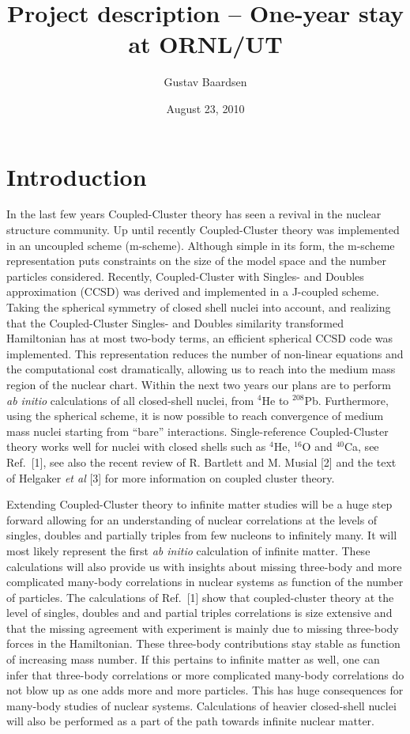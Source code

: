 \documentclass[12pt,titlepage]{article}
\begin{document}

\title{Project description -- One-year stay at ORNL/UT}
\author{Gustav Baardsen}
\date{August 23, 2010}
\maketitle
\tableofcontents
\section{Introduction}
In the last few years Coupled-Cluster theory has seen a revival in 
the nuclear structure community. Up until recently Coupled-Cluster 
theory was implemented in an uncoupled scheme (m-scheme). 
Although simple in its form, the m-scheme representation puts
constraints on the size of the model space
and the number particles considered. Recently, Coupled-Cluster with Singles- and Doubles approximation (CCSD)
was derived and implemented in a J-coupled scheme. Taking the spherical 
symmetry of closed shell nuclei into account, and realizing that the
Coupled-Cluster Singles- and Doubles similarity transformed
Hamiltonian has at most two-body terms, an efficient spherical CCSD code was implemented. This 
representation reduces the number of non-linear equations and  the computational cost dramatically, 
allowing us to reach into the medium mass region of the nuclear
chart. Within the next two years our plans are to perform {\em ab initio} calculations of all closed-shell nuclei, from $^4$He to $^{208}$Pb.
Furthermore, using
the spherical scheme, it is now 
possible to reach convergence of medium mass nuclei starting from ``bare'' interactions. 
Single-reference Coupled-Cluster theory works well for nuclei with closed shells such as $^4$He, $^{16}$O
and $^{40}$Ca, see Ref.~[1], see also 
the recent review of R. Bartlett and M. Musial [2] and the text of Helgaker 
{\em et al} [3] for more information on coupled cluster theory.

Extending Coupled-Cluster theory to infinite matter studies will be a huge step forward allowing for an understanding of nuclear correlations at the levels of
singles, doubles and partially triples from few nucleons to infinitely many. It will most likely represent the first {\em ab initio}  calculation of infinite matter. These calculations will also provide us with insights about missing three-body and more complicated many-body correlations in nuclear systems as function of the number of particles. The calculations
of Ref.~[1] show that coupled-cluster theory at the level of singles, doubles and and partial triples correlations is size extensive and that the missing
agreement with experiment is mainly due to missing three-body forces in the Hamiltonian.  These three-body contributions stay stable as function of increasing
mass number. If this pertains to infinite matter as well, one can infer 
that three-body correlations or more complicated many-body correlations do not
blow up as one adds more and more particles. This has huge consequences for many-body studies of nuclear systems. 
Calculations of heavier closed-shell nuclei will also be performed as a part of the path towards infinite nuclear matter.
\end{document}
